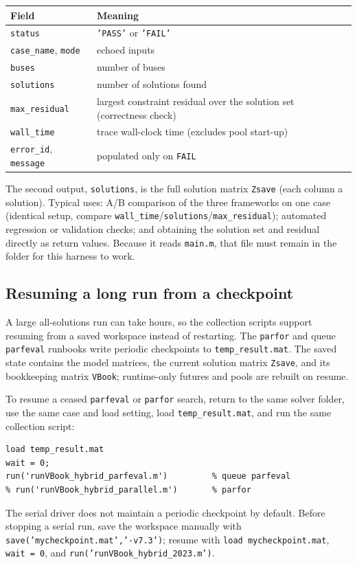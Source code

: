 \documentclass[11pt,a4paper]{article}
\newcommand{\code}[1]{\texttt{#1}}
\begin{document}
\begin{center}\small
\begin{tabular}{@{}ll@{}}
\toprule
Field & Meaning\\
\midrule
\code{status} & \code{'PASS'} or \code{'FAIL'}\\
\code{case_name}, \code{mode} & echoed inputs\\
\code{buses} & number of buses\\
\code{solutions} & number of solutions found\\
\code{max_residual} & largest constraint residual over the solution set (correctness check)\\
\code{wall_time} & trace wall-clock time (excludes pool start-up)\\
\code{error_id}, \code{message} & populated only on \code{FAIL}\\
\bottomrule
\end{tabular}
\end{center}
The second output, \code{solutions}, is the full solution matrix \code{Zsave} (each column
a solution). Typical uses: A/B comparison of the three frameworks on one case (identical
setup, compare \code{wall_time}/\code{solutions}/\code{max_residual}); automated
regression or validation checks; and obtaining the solution set and residual directly as
return values. Because it reads \code{main.m}, that file must remain in the folder for
this harness to work.

\subsection{Resuming a long run from a checkpoint}\label{sec:resume}
A large all-solutions run can take hours, so the collection scripts support resuming from a
saved workspace instead of restarting. The \code{parfor} and queue \code{parfeval} runbooks
write periodic checkpoints to \code{temp_result.mat}. The saved state contains the model
matrices, the current solution matrix \code{Zsave}, and its bookkeeping matrix \code{VBook};
runtime-only futures and pools are rebuilt on resume.

To resume a ceased \code{parfeval} or \code{parfor} search, return to the same solver
folder, use the same case and load setting, load \code{temp_result.mat}, and run the same
collection script:
\begin{lstlisting}[style=mat]
load temp_result.mat
wait = 0;
run('runVBook_hybrid_parfeval.m')         % queue parfeval
% run('runVBook_hybrid_parallel.m')       % parfor
\end{lstlisting}
The serial driver does not maintain a periodic checkpoint by default. Before stopping a
serial run, save the workspace manually with \code{save('mycheckpoint.mat','-v7.3')}; resume
with \code{load mycheckpoint.mat}, \code{wait = 0}, and
\code{run('runVBook_hybrid_2023.m')}.
\end{document}
